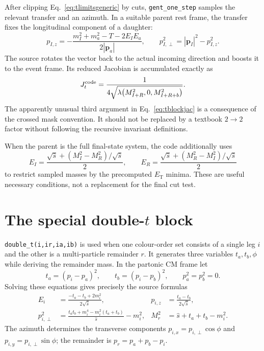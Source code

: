\documentclass[11pt,a4paper]{article}
\newcommand{\shat}{\hat{s}}
\newcommand{\code}[1]{\texttt{#1}}
\newcommand{\lam}{\lambda}
\newcommand{\ET}{E_{\mathrm{T}}}
\begin{document}
After clipping Eq.~\eqref{eq:tlimitsgeneric} by cuts, \code{gent\_one\_step}
samples the relevant transfer and an azimuth.  In a suitable parent rest frame,
the transfer fixes the longitudinal component of a daughter:
\begin{equation}
 p_{I,z}=-\frac{m_I^2+m_a^2-T-2E_I E_a}{2|\boldsymbol p_a|},
 \qquad p_{I,\perp}^2=|\boldsymbol p_I|^2-p_{I,z}^2 .
 \label{eq:treconstruct}
\end{equation}
The source rotates the vector back to the actual incoming direction and boosts
it to the event frame.  Its reduced Jacobian is accumulated exactly as
\begin{equation}
 J_t^{\rm code}=
 \frac{1}{4\sqrt{\lam\bigl(M_{I+R}^2,0,M_{I+R+b}^2\bigr)}}.
 \label{eq:tblockjac}
\end{equation}
The apparently unusual third argument in Eq.~\eqref{eq:tblockjac} is a
consequence of the crossed mask convention.  It should not be replaced by a
textbook $2\to2$ factor without following the recursive invariant definitions.

When the parent is the full final-state system, the code additionally uses
\begin{equation}
 E_I=\frac{\sqrt{\shat}+(M_I^2-M_R^2)/\sqrt{\shat}}{2},\qquad
 E_R=\frac{\sqrt{\shat}+(M_R^2-M_I^2)/\sqrt{\shat}}{2}
 \label{eq:twobodyenergies}
\end{equation}
to restrict sampled masses by the precomputed $\ET$ minima.  These are useful
necessary conditions, not a replacement for the final cut test.

\section{The special double-$t$ block}

\code{double\_t(i,ir,ia,ib)} is used when one colour-order set consists of a
single leg $i$ and the other is a multi-particle remainder $r$.  It generates
three variables $t_a,t_b,\phi$ while deriving the remainder mass.  In the
partonic CM frame let
\begin{equation}
 t_a=(p_i-p_a)^2,\qquad t_b=(p_i-p_b)^2,
 \qquad p_a^2=p_b^2=0 .
 \label{eq:doubletdefs}
\end{equation}
Solving these equations gives precisely the source formulas
\begin{align}
 E_i&=\frac{-t_a-t_b+2m_i^2}{2\sqrt{\shat}}, &
 p_{i,z}&=\frac{t_a-t_b}{2\sqrt{\shat}},\\
 p_{i,\perp}^2&=
 \frac{t_at_b+m_i^4-m_i^2(t_a+t_b)}{\shat}-m_i^2,
 & M_r^2&=\shat+t_a+t_b-m_i^2 .
 \label{eq:doubletsolution}
\end{align}
The azimuth determines the transverse components
$p_{i,x}=p_{i,\perp}\cos\phi$ and
$p_{i,y}=p_{i,\perp}\sin\phi$; the remainder is $p_r=p_a+p_b-p_i$.
\end{document}
